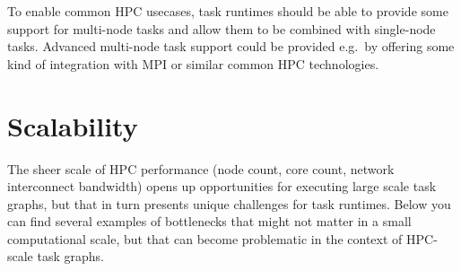 To enable common HPC usecases, task runtimes should be able to provide some support for multi-node
tasks and allow them to be combined with single-node tasks. Advanced multi-node task support could
be provided e.g.\ by offering some kind of integration with MPI or similar common HPC technologies.

\section{Scalability}
The sheer scale of HPC performance (node count, core count, network interconnect bandwidth) opens
up opportunities for executing large scale task graphs, but that in turn presents unique challenges
for task runtimes. Below you can find several examples of bottlenecks that might not matter in a
small computational scale, but that can become problematic in the context of HPC-scale task graphs.

